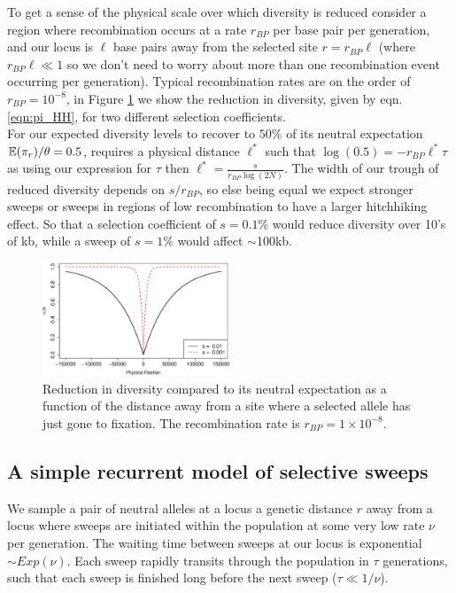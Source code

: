 To get a sense of the physical scale over which diversity is reduced
consider a region where recombination occurs at a rate $r_{BP}$ per
base pair per generation, and our locus is $ \ell $ base pairs away from the
selected site $r=r_{BP } \ell $ (where $r_{BP}  \ell  \ll 1$ so we don't need to
worry about more than one recombination event occurring per
generation). Typical
recombination rates are on the order of $r_{BP} = 10^{-8}$, in Figure
\ref{fig:hitchhiking_reduction} we show the reduction in diversity,
given by eqn. \eqref{eqn:pi_HH}, for two different selection coefficients.\\ 

For our expected diversity levels to recover to $50\%$ of
its neutral expectation $\mathbb{E}(\pi_r)/\theta=0.5$, requires a physical
distance $\ell^{*}$ such that $\log(0.5) = -r_{BP} \ell ^*\tau$ as using our
expression for $\tau$ then $ \ell^* = \frac{s}{r_{BP} \log (2N) }$. The width of our trough of reduced diversity depends on $s/r_{BP}$,
so  else being equal we expect stronger sweeps or sweeps in regions of low
recombination to have a larger hitchhiking effect. So that a selection coefficient of $s=0.1\%$ would reduce
diversity over 10's of kb, while a sweep of $s=1\%$ would affect
$\sim$100kb.   \\


\begin{figure}
\begin{center}
\includegraphics[width=0.5\textwidth]{figures/hitchhiking_reduction.eps}
\end{center}
\caption{Reduction in diversity compared to its neutral expectation as
a function of the distance away from a site where a selected allele
has just gone to fixation. The recombination rate is $r_{BP}= 1\times
10^{-8}$.} \label{fig:hitchhiking_reduction}
\end{figure}

\subsection{A simple recurrent model of selective sweeps}
We sample a pair of neutral alleles at a locus a genetic distance $r$ away from a locus where
sweeps are initiated within the population at some very low rate $\nu$
per generation. The waiting time between sweeps
at our locus is exponential $\sim Exp(\nu)$. Each sweep rapidly transits through the population in $\tau$
generations, such that each sweep is finished long before the next
sweep ($\tau \ll 1/\nu$). \\

